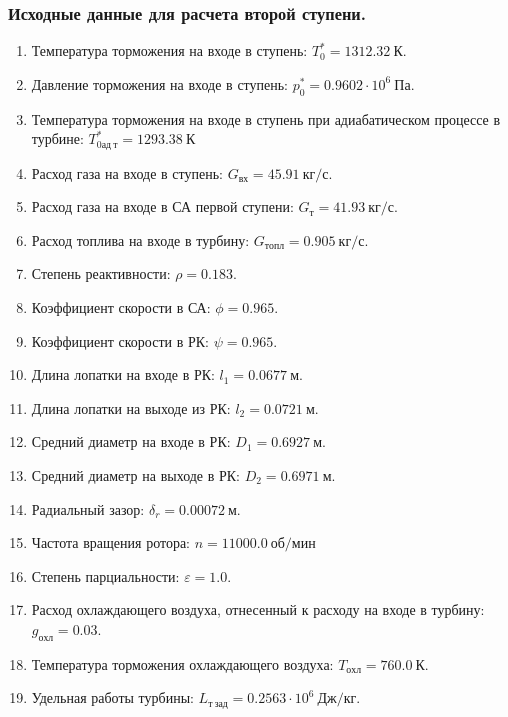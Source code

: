 \documentclass[a4paper,12pt]{article}
\begin{document}
    \subsubsection{Исходные данные для расчета второй ступени.}
%    
    \begin{enumerate}

        \item Температура торможения на входе в ступень: $T_0^* = 1312.32\ К $.
        \item Давление торможения на входе в ступень: $p_0^* = 0.9602 \cdot 10^6 \ Па$.
        \item Температура торможения на входе в ступень при адиабатическом процессе в турбине: $T_{0ад\ т}^* = 1293.38\ К$
        \item Расход газа на входе в ступень: $G_{вх} = 45.91\ кг/с$.
        \item Расход газа на входе в СА первой ступени: $ G_т = 41.93\ кг/с $.
        \item Расход топлива на входе в турбину: $ G_{топл} = 0.905\ кг/с $.
        \item Степень реактивности: $ \rho = 0.183 $.
        \item Коэффициент скорости в СА: $ \phi = 0.965 $.
        \item Коэффициент скорости в РК: $ \psi = 0.965 $.
        \item Длина лопатки на входе в РК: $ l_1 = 0.0677\ м $.
        \item Длина лопатки на выходе из РК: $ l_2 = 0.0721\ м $.
        \item Средний диаметр на входе в РК: $ D_1 = 0.6927\ м $.
        \item Средний диаметр на выходе в РК: $ D_2 = 0.6971\ м $.
        \item Радиальный зазор: $ \delta_r = 0.00072\ м $.
        \item Частота вращения ротора: $ n = 11000.0\ об/мин $
        \item Степень парциальности: $ \varepsilon = 1.0 $.
        \item Расход охлаждающего воздуха, отнесенный к расходу на входе в турбину: $ g_{охл} = 0.03 $.
        \item Температура торможения охлаждающего воздуха: $ T_{охл} = 760.0\ К $.

        
        \item Удельная работы турбины: $ L_{т\ зад} = 0.2563 \cdot 10^6 \ Дж/кг $.

        

    \end{enumerate}
    
\end{document}
